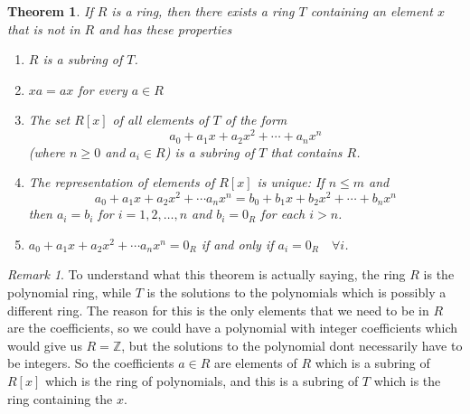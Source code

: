 \documentclass{article}
\newtheorem{theorem}{Theorem}[section]
\theoremstyle{definition}
\theoremstyle{remark}
\newtheorem{remark}{Remark}[section]
\begin{document}
\begin{theorem}
If $R$ is a ring, then there exists a ring $T$ containing an element $x$ that is 
not in $R$ and has these properties
\begin{enumerate}
\item $R$ is a subring of $T$.
\item $xa = ax$ for every $a \in R$
\item The set $R[x]$ of all elements of $T$ of the form \[
a_0 + a_1x + a_2x^2 + \cdots + a_nx^n
\]
(where $n \geq 0$ and $a_i \in R$) is a subring of $T$ that contains $R$.
\item The representation of elements of $R[x]$ is unique: If $n \leq m$ and 
\[
a_0 + a_1x+a_2x^2 + \cdots a_nx^n = b_0 + b_1x + b_2x^2 + \cdots + b_nx^n
\]
then $a_i = b_i$ for $i=1,2,\dots, n$ and $b_i = 0_R$ for each $i > n$.
\item $a_0 + a_1x + a_2x^2 + \cdots a_nx^n = 0_R$ if and only if $a_i = 0_R \quad \forall i$.
\end{enumerate}
\end{theorem}
\begin{remark}
To understand what this theorem is actually saying, the ring $R$ is the polynomial 
ring, while $T$ is the solutions to the polynomials which is possibly a different ring. The 
reason for this is the only elements that we need to be in $R$ are the coefficients, so we could 
have a polynomial with integer coefficients which would give us $R = \mathbb{Z}$, but the solutions to 
the polynomial dont necessarily have to be integers. So the coefficients $a \in R$ are elements of 
$R$ which is a subring of $R[x]$ which is the ring of polynomials, and this is a subring of $T$ which 
is the ring containing the $x$.
\end{remark}
\end{document}
